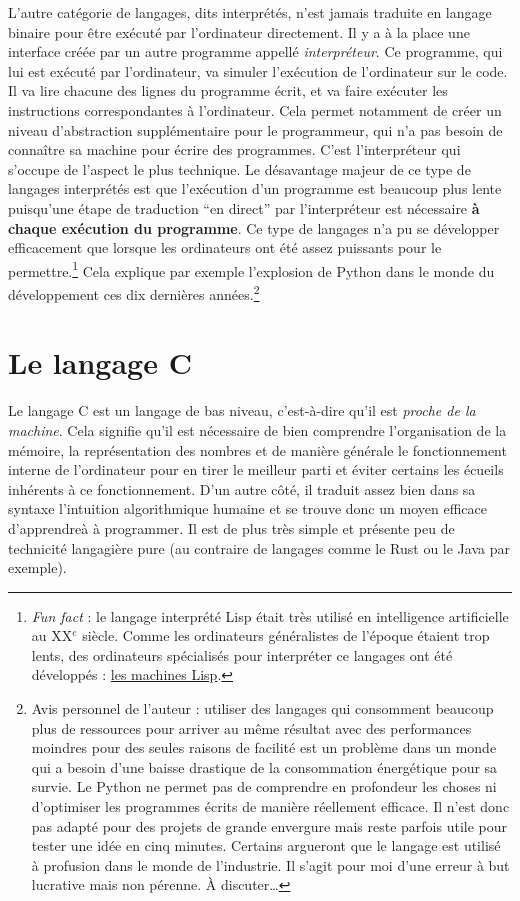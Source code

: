 \documentclass[../../main.tex]{subfiles}
\begin{document}
L'autre catégorie de langages, dits interprétés, n'est jamais traduite en langage binaire pour être exécuté par l'ordinateur directement. Il y a à la place une interface créée par un autre programme appellé \textit{interpréteur}. Ce programme, qui lui est exécuté par l'ordinateur, va simuler l'exécution de l'ordinateur sur le code. Il va lire chacune des lignes du programme écrit, et va faire exécuter les instructions correspondantes à l'ordinateur. Cela permet notamment de créer un niveau d'abstraction supplémentaire pour le programmeur, qui n'a pas besoin de connaître sa machine pour écrire des programmes. C'est l'interpréteur qui s'occupe de l'aspect le plus technique. Le désavantage majeur de ce type de langages interprétés est que l'exécution d'un programme est beaucoup plus lente puisqu'une étape de traduction ``en direct'' par l'interpréteur est nécessaire \textbf{à chaque exécution du programme}. Ce type de langages n'a pu se développer efficacement que lorsque les ordinateurs ont été assez puissants pour le permettre.\footnote{\textit{Fun fact} : le langage interprété Lisp était très utilisé en intelligence artificielle au XX$^e$ siècle. Comme les ordinateurs généralistes de l'époque étaient trop lents, des ordinateurs spécialisés pour interpréter ce langages ont été développés : \href{https://fr.wikipedia.org/wiki/Machine_Lisp}{les machines Lisp}.} Cela explique par exemple l'explosion de Python dans le monde du développement ces dix dernières années.\footnote{Avis personnel de l'auteur : utiliser des langages qui consomment beaucoup plus de ressources pour arriver au même résultat avec des performances moindres pour des seules raisons de facilité est un problème dans un monde qui a besoin d'une baisse drastique de la consommation énergétique pour sa survie. Le Python ne permet pas de comprendre en profondeur les choses ni d'optimiser les programmes écrits de manière réellement efficace. Il n'est donc pas adapté pour des projets de grande envergure mais reste parfois utile pour tester une idée en cinq minutes. Certains argueront que le langage est utilisé à profusion dans le monde de l'industrie. Il s'agit pour moi d'une erreur à but lucrative mais non pérenne. À discuter\dots}
\section{Le langage C} \label{sec:le_langage_c}
Le langage C est un langage de bas niveau, c'est-à-dire qu'il est \textit{proche de la machine}. Cela signifie qu’il est nécessaire de bien comprendre l’organisation de la mémoire, la représentation des nombres et de manière générale le fonctionnement interne de l'ordinateur pour en tirer le meilleur parti et éviter certains les écueils inhérents à ce fonctionnement. D'un autre côté, il traduit assez bien dans sa syntaxe l'intuition algorithmique humaine et se trouve donc un moyen efficace d'apprendreà à programmer. Il est de plus très simple et présente peu de technicité langagière pure (au contraire de langages comme le Rust ou le Java par exemple).
\end{document}
